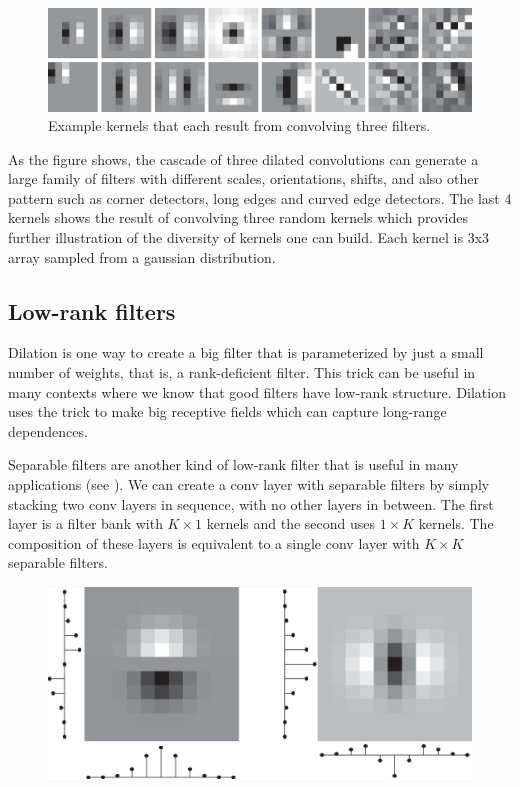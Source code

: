 \begin{figure}[h]
\centerline{
    \includegraphics[width=1\linewidth]{./figures/convolutional_neural_nets/dilated_examples.eps}}
    \caption{Example kernels that each result from convolving three filters.}
    \label{fig:convolutional_neural_nets:kernels_resulting_from_dilated_filters}
\end{figure}

As the figure shows, the cascade of three dilated convolutions can generate a large family of filters with different scales, orientations, shifts, and also other pattern such as corner detectors, long edges and curved edge detectors. The last 4 kernels shows the result of convolving three random kernels which provides further illustration of the diversity of kernels one can build. Each kernel is 3x3 array sampled from a gaussian distribution. 

\subsection{Low-rank filters}
Dilation is one way to create a big filter that is parameterized by just a small number of weights, that is, a rank-deficient filter. This trick can be useful in many contexts where we know that good filters have low-rank structure. Dilation uses the trick to make big receptive fields which can capture long-range dependences.

Separable filters are another kind of low-rank filter that is useful in many applications (see \chap{\ref{chapter:fourier_analysis}}). We can create a conv layer with separable filters by simply stacking two conv layers in sequence, with no other layers in between. The first layer is a filter bank with $K \times 1$ kernels and the second uses $1 \times K$ kernels. The composition of these layers is equivalent to a single conv layer with $K \times K$ separable filters.


\begin{figure}[h]
\centerline{
    \includegraphics[width=.6\linewidth]{./figures/convolutional_neural_nets/kernels_separable_aprox.eps}}
\end{figure}


